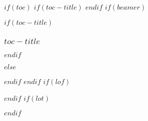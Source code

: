 $if(toc)$
$if(toc-title)$
\renewcommand*\contentsname{\color{myCyan}$toc-title$}
$endif$
$if(beamer)$
\begin{frame}[allowframebreaks]
$if(toc-title)$
  \frametitle{$toc-title$}
$endif$
  \tableofcontents[hideallsubsections]
\end{frame}
$else$
{
\setcounter{tocdepth}{$toc-depth$}
\cleardoublepage

\tableofcontents

}
$endif$
$endif$
$if(lof)$
\listoffigures
$endif$
$if(lot)$
\listoftables
$endif$